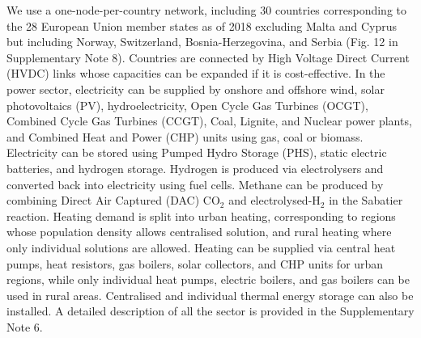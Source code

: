 \documentclass[5p]{elsarticle} %
\begin{document}
We use a one-node-per-country network, including 30 countries corresponding to the 28 European Union member states as of 2018 excluding Malta and Cyprus but including Norway, Switzerland, Bosnia-Herzegovina, and Serbia (Fig. 12 in Supplementary Note 8). Countries are connected by High Voltage Direct Current (HVDC) links whose capacities can be expanded if it is cost-effective. In the power sector, electricity can be supplied by onshore and offshore wind, solar photovoltaics (PV), hydroelectricity, Open Cycle Gas Turbines (OCGT), Combined Cycle Gas Turbines (CCGT), Coal, Lignite, and Nuclear power plants, and Combined Heat and Power (CHP) units using gas, coal or biomass. Electricity can be stored using Pumped Hydro Storage (PHS), static electric batteries, and hydrogen storage. Hydrogen is produced via electrolysers and converted back into electricity using fuel cells. Methane can be produced by combining Direct Air Captured (DAC) CO$_2$ and electrolysed-H$_2$ in the Sabatier reaction. Heating demand is split into urban heating, corresponding to regions whose population density allows centralised solution, and rural heating where only individual solutions are allowed. Heating can be supplied via central heat pumps, heat resistors, gas boilers, solar collectors, and CHP units for urban regions, while only individual heat pumps, electric boilers, and gas boilers can be used in rural areas. Centralised and individual thermal energy storage can also be installed. A detailed description of all the sector is provided in the Supplementary Note 6. \

\end{document}
